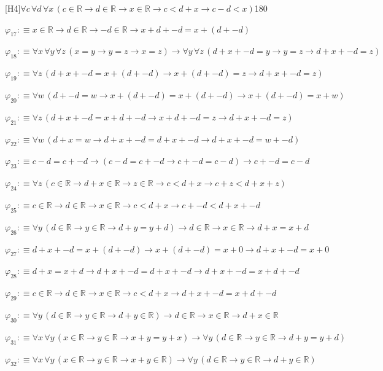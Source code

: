 \begin{fullproof}{[H4]}{$\forall c\,\forall d\,\forall x\,(c \in \mathbb{R} \to d \in \mathbb{R} \to x \in \mathbb{R} \to c < d + x \to c - d < x)$}{180}
\begin{abbrevlist}
\item $\varphi_{17} :\equiv x \in \mathbb{R} \to d \in \mathbb{R} \to -d \in \mathbb{R} \to x + d + -d = x + (d + -d)$
\item $\varphi_{18} :\equiv \forall x\,\forall y\,\forall z\,(x = y \to y = z \to x = z) \to \forall y\,\forall z\,(d + x + -d = y \to y = z \to d + x + -d = z)$
\item $\varphi_{19} :\equiv \forall z\,(d + x + -d = x + (d + -d) \to x + (d + -d) = z \to d + x + -d = z)$
\item $\varphi_{20} :\equiv \forall w\,(d + -d = w \to x + (d + -d) = x + (d + -d) \to x + (d + -d) = x + w)$
\item $\varphi_{21} :\equiv \forall z\,(d + x + -d = x + d + -d \to x + d + -d = z \to d + x + -d = z)$
\item $\varphi_{22} :\equiv \forall w\,(d + x = w \to d + x + -d = d + x + -d \to d + x + -d = w + -d)$
\item $\varphi_{23} :\equiv c - d = c + -d \to (c - d = c + -d \to c + -d = c - d) \to c + -d = c - d$
\item $\varphi_{24} :\equiv \forall z\,(c \in \mathbb{R} \to d + x \in \mathbb{R} \to z \in \mathbb{R} \to c < d + x \to c + z < d + x + z)$
\item $\varphi_{25} :\equiv c \in \mathbb{R} \to d \in \mathbb{R} \to x \in \mathbb{R} \to c < d + x \to c + -d < d + x + -d$
\item $\varphi_{26} :\equiv \forall y\,(d \in \mathbb{R} \to y \in \mathbb{R} \to d + y = y + d) \to d \in \mathbb{R} \to x \in \mathbb{R} \to d + x = x + d$
\item $\varphi_{27} :\equiv d + x + -d = x + (d + -d) \to x + (d + -d) = x + 0 \to d + x + -d = x + 0$
\item $\varphi_{28} :\equiv d + x = x + d \to d + x + -d = d + x + -d \to d + x + -d = x + d + -d$
\item $\varphi_{29} :\equiv c \in \mathbb{R} \to d \in \mathbb{R} \to x \in \mathbb{R} \to c < d + x \to d + x + -d = x + d + -d$
\item $\varphi_{30} :\equiv \forall y\,(d \in \mathbb{R} \to y \in \mathbb{R} \to d + y \in \mathbb{R}) \to d \in \mathbb{R} \to x \in \mathbb{R} \to d + x \in \mathbb{R}$
\item $\varphi_{31} :\equiv \forall x\,\forall y\,(x \in \mathbb{R} \to y \in \mathbb{R} \to x + y = y + x) \to \forall y\,(d \in \mathbb{R} \to y \in \mathbb{R} \to d + y = y + d)$
\item $\varphi_{32} :\equiv \forall x\,\forall y\,(x \in \mathbb{R} \to y \in \mathbb{R} \to x + y \in \mathbb{R}) \to \forall y\,(d \in \mathbb{R} \to y \in \mathbb{R} \to d + y \in \mathbb{R})$

\end{abbrevlist}
\end{fullproof}
